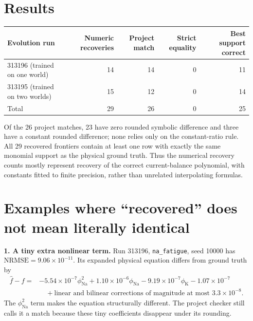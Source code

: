 \documentclass[10pt]{article}
\newcommand{\nrmse}{\mathrm{NRMSE}}
\newcommand{\phina}{\phi_{\mathrm{Na}}}
\newcommand{\phik}{\phi_{\mathrm{K}}}
\begin{document}
\section*{Results}

\begin{center}
\begin{tabular}{lrrrr}
\toprule
Evolution run & Numeric recoveries & Project match & Strict equality & Best support correct\\
\midrule
313196 (trained on one world) & 14 & 14 & 0 & 11\\
313195 (trained on two worlds) & 15 & 12 & 0 & 14\\
\midrule
Total & 29 & 26 & 0 & 25\\
\bottomrule
\end{tabular}
\end{center}

Of the 26 project matches, 23 have zero rounded symbolic difference and three
have a constant rounded difference; none relies only on the constant-ratio rule.
All 29 recovered frontiers contain at least one row with exactly the same monomial
support as the physical ground truth.  Thus the numerical recovery counts mostly
represent recovery of the correct current-balance polynomial, with constants fitted
to finite precision, rather than unrelated interpolating formulas.

\section*{Examples where ``recovered'' does not mean literally identical}

\textbf{1. A tiny extra nonlinear term.}
Run 313196, \texttt{na\_fatigue}, seed 10000 has
$\nrmse=9.06\times10^{-11}$.  Its expanded physical equation differs from ground
truth by
\begin{align*}
\hat f-f={}&-5.54\times10^{-7}\phina^2
 +1.10\times10^{-6}\phina-9.19\times10^{-7}\phik
 -1.07\times10^{-7}\\
&\quad+\text{linear and bilinear corrections of magnitude at most }3.3\times10^{-8}.
\end{align*}
The $\phina^2$ term makes the equation structurally different.  The project checker
still calls it a match because these tiny coefficients disappear under its rounding.
\end{document}
